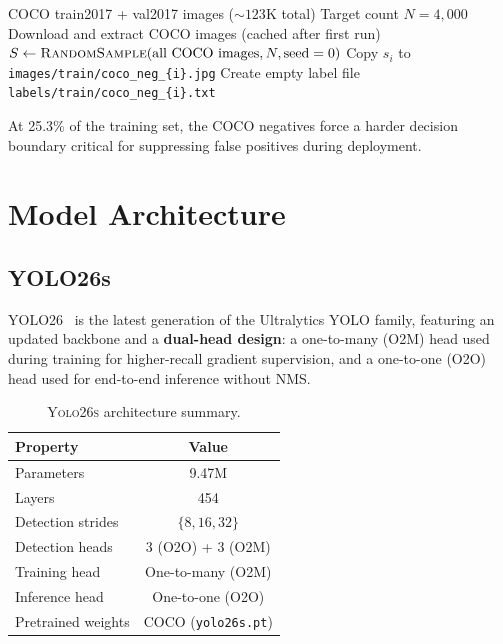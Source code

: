 \documentclass[12pt, titlepage]{article}
\begin{document}
\begin{algorithm}[h]
  \caption{COCO Hard Negative Mining Pipeline}
  \label{alg:coco}
  \begin{algorithmic}[1]
    \Require COCO train2017 + val2017 images (${\sim}123$K total)
    \Require Target count $N = 4{,}000$
    \State Download and extract COCO images (cached after first run)
    \State $S \gets \textsc{RandomSample}(\text{all COCO images}, N, \text{seed}=0)$
    \State Copy $s_i$ to \texttt{images/train/coco\_neg\_\{i\}.jpg}
    \State Create empty label file \texttt{labels/train/coco\_neg\_\{i\}.txt}
    \EndFor
  \end{algorithmic}
\end{algorithm}

At 25.3\% of the training set, the COCO negatives force a harder decision
boundary critical for suppressing false positives during deployment.

\section{Model Architecture}
\label{sec:arch}

\subsection{YOLO26s}

YOLO26~\citep{ultralytics2025yolo} is the latest generation of the Ultralytics
YOLO family, featuring an updated backbone and a \textbf{dual-head design}: a
one-to-many (O2M) head used during training for higher-recall gradient
supervision, and a one-to-one (O2O) head used for end-to-end inference without
NMS.

\begin{table}[h]
  \centering
  \caption{\textsc{Yolo26s} architecture summary.}
  \label{tab:arch}
  \begin{tabular}{@{}lc@{}}
    \toprule
    \textbf{Property}  & \textbf{Value}             \\
    \midrule
    Parameters         & 9.47M                      \\
    Layers             & 454                        \\
    Detection strides  & $\{8, 16, 32\}$            \\
    Detection heads    & 3 (O2O) + 3 (O2M)          \\
    Training head      & One-to-many (O2M)          \\
    Inference head     & One-to-one (O2O)           \\
    Pretrained weights & COCO (\texttt{yolo26s.pt}) \\
    \bottomrule
  \end{tabular}
\end{table}
\end{document}
